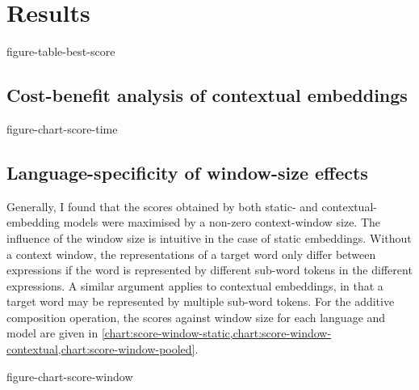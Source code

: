 \section{Results}
\label{sec:results}

{figure-table-best-score}

\subsection{Cost-benefit analysis of contextual embeddings}
\label{sec:cost-benefit}

{figure-chart-score-time}


\subsection{Language-specificity of window-size effects}

Generally, I found that the scores obtained by both static- and contextual-embedding
models were maximised by a non-zero context-window size.
The influence of the window size is intuitive in the case of static embeddings.
Without a context window, the representations of a target word only differ between
expressions if the word is represented by different sub-word tokens in the different
expressions.
A similar argument applies to contextual embeddings, in that a target word may be
represented by multiple sub-word tokens.
For the additive composition operation, the scores against window size for each
language and model are given in
\cref{chart:score-window-static,chart:score-window-contextual,chart:score-window-pooled}.

{figure-chart-score-window}